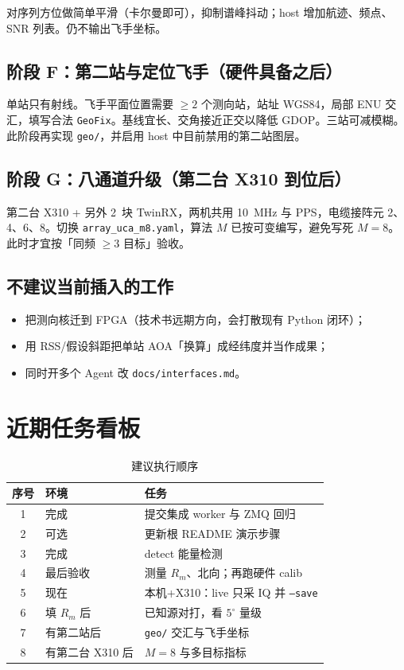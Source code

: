 \documentclass[UTF8,a4paper,12pt,zihao=-4]{ctexart}
\newcommand{\done}[1]{\textcolor{doneC}{#1}}
\newcommand{\pend}[1]{\textcolor{pendC}{#1}}
\newcommand{\remind}[1]{\textcolor{remindC}{#1}}
\begin{document}
对序列方位做简单平滑（卡尔曼即可），抑制谱峰抖动；host 增加航迹、频点、SNR 列表。仍不输出飞手坐标。

\subsection{阶段 F：第二站与定位飞手（硬件具备之后）}

单站只有射线。飞手平面位置需要 $\ge 2$ 个测向站，站址 WGS84，局部 ENU 交汇，填写合法 \texttt{GeoFix}。基线宜长、交角接近正交以降低 GDOP。三站可减模糊。此阶段再实现 \texttt{geo/}，并启用 host 中目前禁用的第二站图层。

\subsection{阶段 G：八通道升级（第二台 X310 到位后）}

第二台 X310 + 另外 2~块 TwinRX，两机共用 10~MHz 与 PPS，电缆接阵元 2、4、6、8。切换 \texttt{array\_uca\_m8.yaml}，算法 $M$ 已按可变编写，避免写死 $M=8$。此时才宜按「同频 $\ge 3$ 目标」验收。

\subsection{不建议当前插入的工作}

\begin{itemize}[leftmargin=2em]
  \item 把测向核迁到 FPGA（技术书远期方向，会打散现有 Python 闭环）；
  \item 用 RSS/假设斜距把单站 AOA「换算」成经纬度并当作成果；
  \item 同时开多个 Agent 改 \texttt{docs/interfaces.md}。
\end{itemize}

\section{近期任务看板}

\begin{table}[htbp]
\centering
\caption{建议执行顺序}
\begin{tabular}{@{}clp{8.4cm}@{}}
\toprule
序号 & 环境 & 任务 \\
\midrule
1 & \done{完成} & \done{提交集成 worker 与 ZMQ 回归} \\
2 & \pend{可选} & \pend{更新根 README 演示步骤} \\
3 & \done{完成} & \done{detect 能量检测} \\
4 & \remind{最后验收} & \remind{测量 $R_m$、北向；再跑硬件 calib} \\
5 & \pend{现在} & \pend{本机+X310：live 只采 IQ 并 \texttt{--save}} \\
6 & \pend{填 $R_m$ 后} & \pend{已知源对打，看 $5^\circ$ 量级} \\
7 & 有第二站后 & \texttt{geo/} 交汇与飞手坐标 \\
8 & 有第二台 X310 后 & $M=8$ 与多目标指标 \\
\bottomrule
\end{tabular}
\end{table}
\end{document}
